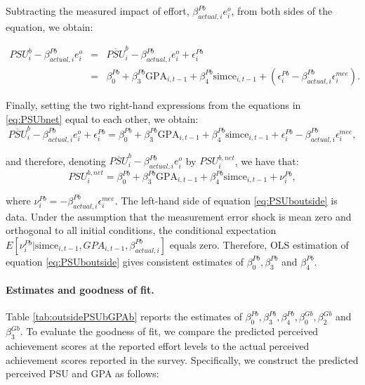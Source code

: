 \noindent Subtracting the measured impact of effort, $\beta_{actual,i}^{Pb}e_i^{o}$, from both sides of the equation, we obtain:

\begin{eqnarray}\label{eq:PSUbnet}
PSU_i^b-\beta_{actual,i}^{Pb}e_i^{o}&=&\overline{PSU}_i^b-\beta_{actual,i}^{Pb}e_i^{o}+\epsilon_i^{Pb} \\ \nonumber
&=&\beta_0^{Pb}+\beta_3^{Pb}\mbox{GPA}_{i,t-1}+\beta_4^{Pb}\mbox{simce}_{i,t-1}+(\epsilon_{i}^{Pb}-\beta^{Pb}_{actual,i}\epsilon_i^{mee}).
\end{eqnarray}

\noindent Finally, setting the two right-hand expressions from the equations in \eqref{eq:PSUbnet} equal to each other, we obtain:
\begin{equation*}
    \overline{PSU}_i^b-\beta_{actual,i}^{Pb}e_i^{o}+\epsilon_i^{Pb}=  \beta_0^{Pb}+\beta_3^{Pb}\mbox{GPA}_{i,t-1}+\beta_4^{Pb}\mbox{simce}_{i,t-1}+\epsilon_{i}^{Pb}-\beta^{Pb}_{actual,i}\epsilon_i^{mee}, 
\end{equation*}

\noindent and therefore, denoting $\overline{PSU}_i^b-\beta_{actual,i}^{Pb}e_i^{o}$ by $PSU_i^{b,net}$, we have that:
\begin{equation}\label{eq:PSUboutside}
    PSU_i^{b,net}=  \beta_0^{Pb}+\beta_3^{Pb}\mbox{GPA}_{i,t-1}+\beta_4^{Pb}\mbox{simce}_{i,t-1}+\nu_i^{Pb}, 
\end{equation}

\noindent where $\nu_i^{Pb}=-\beta^{Pb}_{actual,i}\epsilon_i^{mee}$. The left-hand side of equation \eqref{eq:PSUboutside} is data. Under the assumption that  the measurement error shock is mean zero and orthogonal to all initial conditions, the conditional expectation $E[\nu_i^{Pb}|\mbox{simce}_{i,t-1},GPA_{i,t-1},\beta^{Pb}_{actual,i} ]$ equals zero. Therefore, OLS estimation of equation \eqref{eq:PSUboutside} gives consistent estimates of $\beta_0^{Pb},\beta_3^{Pb}$ and $\beta_4^{Pb}$.\\



\paragraph{Estimates and goodness of fit.}  Table \ref{tab:outsidePSUbGPAb} reports the estimates of $\beta_0^{Pb},\beta_3^{Pb},\beta_4^{Pb},\beta^{Gb}_{0},\beta^{Gb}_{2}$ and $\beta^{Gb}_{3}$. To evaluate the goodness of fit,  we compare the predicted perceived achievement scores at the reported effort levels to the actual perceived achievement scores reported in the survey. Specifically, we construct the predicted perceived PSU and GPA as follows:

